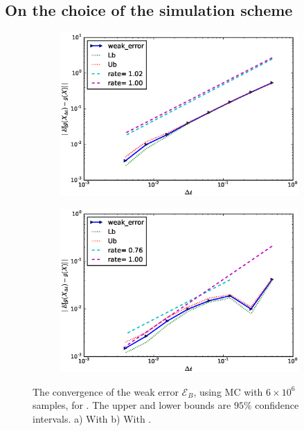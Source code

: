 \documentclass[ima, 20pt, portrait, plainboxedsections]{sciposter}
\begin{document}
\begin{multicols}{3}
\section*{On the choice of the simulation scheme}
\begin{figure}[h!]
	\centering
	\begin{subfigure}{.5\textwidth}
		\centering
		\includegraphics[width=1\linewidth]{./rBergomi_weak_error_rates/without_richardson/H_007/weak_convergence_order_Bergomi_H_007_K_1_M_4_10_6_CI_relative_hybrid_non_hierarchical_non_parallel_asymptotic}
		\caption{}
		\label{fig:set1_weak_rate_hybrid}
	\end{subfigure}%
	\begin{subfigure}{.5\textwidth}
		\centering
		\includegraphics[width=1\linewidth]{./rBergomi_weak_error_cholesky/weak_convergence_order_Bergomi_H_007_K_1_M_4_10_6_CI_relative_cholesky_non_hierarchical_non_parallel_asymptotic}
		\caption{}
		\label{fig:set1_weak_rate_exact}
	\end{subfigure}
	\caption{The convergence of the weak error $\mathcal{E}_B$, using MC with $6 \times 10^6$ samples, for . The upper and lower bounds are $95\%$ confidence intervals. a) With   b) With .}
	\label{fig:Weak_rate_set1_set_2_without_rich_hyb+chol}
\end{figure}
	

\end{multicols}
\end{document}
